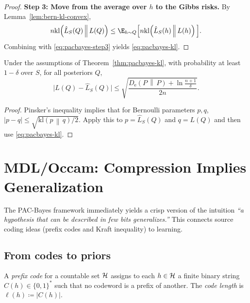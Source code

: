 \documentclass{article}
\numberwithin{equation}{section}
\newcommand{\kl}[2]{\mathrm{kl}\!\left(#1\,\middle\|\,#2\right)}
\newcommand{\KLnat}[2]{D_{\mathrm{e}}\!\left(#2\,\middle\|\,#2\right)}
\newcommand{\cH}{{\cal H}}
\begin{document}
\begin{proof}
\textbf{Step 3: Move from the average over $h$ to the Gibbs risks.}
By Lemma~\ref{lem:bern-kl-convex},
\begin{equation}
    n\kl{\hat L_S(Q)}{L(Q)}
    \le \E_{h\sim Q}\Big[n\kl{\hat L_S(h)}{L(h)}\Big].
\end{equation}
Combining with \eqref{eq:pacbayes-step3} yields \eqref{eq:pacbayes-kl}.
\end{proof}

\begin{corollary}
\label{cor:pacbayes-sqrt}
Under the assumptions of Theorem~\ref{thm:pacbayes-kl}, with probability at least $1-\delta$ over $S$,
for all posteriors $Q$,
\begin{equation}
    \big|L(Q)-\hat L_S(Q)\big|
    \le \sqrt{\frac{\KLnat{Q}{P} + \ln\frac{n+1}{\delta}}{2n}}.
\end{equation}
\end{corollary}
\begin{proof}
Pinsker's inequality implies that for Bernoulli parameters $p,q$,
\(|p-q|\le \sqrt{\kl{p}{q}/2}\).
Apply this to $p=\hat L_S(Q)$ and $q=L(Q)$ and then use \eqref{eq:pacbayes-kl}.
\end{proof}

\section{MDL/Occam: Compression Implies Generalization}
\label{sec:mdl-occam}

The PAC-Bayes framework immediately yields a crisp version of the intuition
\emph{``a hypothesis that can be described in few bits generalizes.''}
This connects source coding ideas (prefix codes and Kraft inequality) to learning.

\subsection{From codes to priors}

\begin{definition}
A \emph{prefix code} for a countable set $\cH$ assigns to each $h\in\cH$ a finite binary string $C(h)\in\{0,1\}^*$ such that no codeword is a prefix of another.
The \emph{code length} is $\ell(h)\coloneqq |C(h)|$.
\end{definition}
\end{document}
